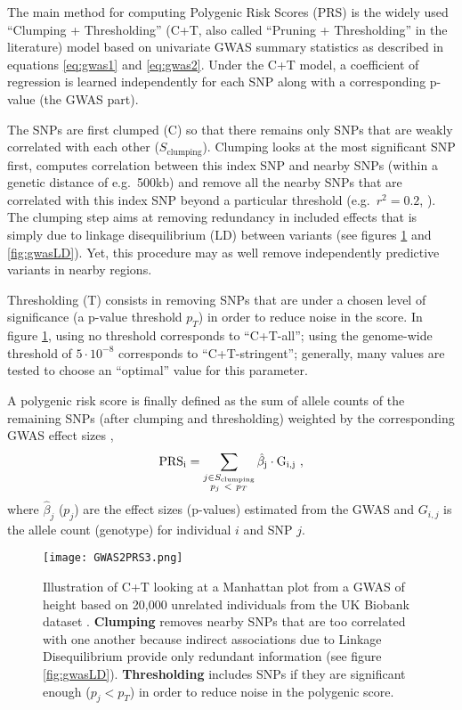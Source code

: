 The main method for computing Polygenic Risk Scores (PRS) is the widely used ``Clumping + Thresholding'' (C+T, also called ``Pruning + Thresholding'' in the literature) model based on univariate GWAS summary statistics as described in equations \eqref{eq:gwas1} and \eqref{eq:gwas2}.
Under the C+T model, a coefficient of regression is learned independently for each SNP along with a corresponding p-value (the GWAS part). 

The SNPs are first clumped (C) so that there remains only SNPs that are weakly correlated with each other ($S_\text{clumping}$). Clumping looks at the most significant SNP first, computes correlation between this index SNP and nearby SNPs (within a genetic distance of e.g.\ 500kb) and remove all the nearby SNPs that are correlated with this index SNP beyond a particular threshold (e.g.\ $r^2 = 0.2$, \cite{wray2014research}). 
The clumping step aims at removing redundancy in included effects that is simply due to linkage disequilibrium (LD) between variants (see figures \ref{fig:gwas2} and \ref{fig:gwasLD}). Yet, this procedure may as well remove independently predictive variants in nearby regions.

Thresholding (T) consists in removing SNPs that are under a chosen level of significance (a p-value threshold $p_T$) in order to reduce noise in the score.
In figure \ref{fig:gwas2}, using no threshold corresponds to ``C+T-all''; using the genome-wide threshold of $5 \cdot 10^{-8}$ corresponds to ``C+T-stringent''; generally, many values are tested to choose an ``optimal'' value for this parameter. 

A polygenic risk score is finally defined as the sum of allele counts of the remaining SNPs (after clumping and thresholding) weighted by the corresponding GWAS effect sizes \cite[]{purcell2009common,Dudbridge2013,wray2014research,Euesden2015},
\[\rm{PRS}_i = \sum_{\substack{j \in S_\text{clumping} \\ p_j~<~p_T}} \hat\beta_j \cdot G_{i,j}~,\] where $\hat\beta_j$ ($p_j$) are the effect sizes (p-values) estimated from the GWAS and $G_{i,j}$ is the allele count (genotype) for individual $i$ and SNP $j$.

\begin{figure}[htb]
\centerline{\texttt{[image: GWAS2PRS3.png]}}
\caption{Illustration of C+T looking at a Manhattan plot from a GWAS of height based on 20,000 unrelated individuals from the UK Biobank dataset \cite[]{bycroft2017genome}. \textbf{\color{clumping}Clumping} removes nearby SNPs that are too correlated with one another because indirect associations due to Linkage Disequilibrium provide only redundant information (see figure \ref{fig:gwasLD}). \textbf{\color{thresholding}Thresholding} includes SNPs if they are significant enough ($p_j < p_T$) in order to reduce noise in the polygenic score.}\label{fig:gwas2}
\end{figure}

